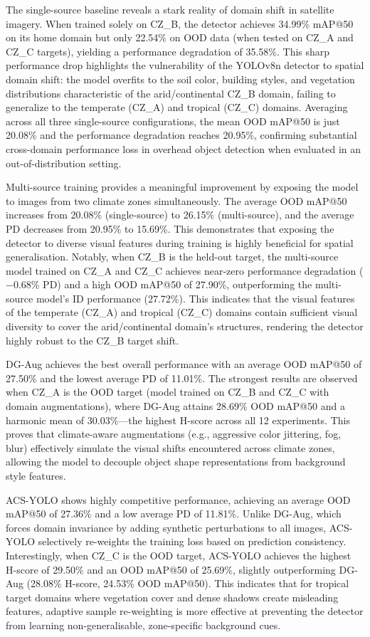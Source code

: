 \documentclass[12pt,a4paper]{article}
\begin{document}
The single-source baseline reveals a stark reality of domain shift in satellite imagery. When trained solely on CZ\_B, the detector achieves 34.99\% mAP@50 on its home domain but only 22.54\% on OOD data (when tested on CZ\_A and CZ\_C targets), yielding a performance degradation of 35.58\%. This sharp performance drop highlights the vulnerability of the YOLOv8n detector to spatial domain shift: the model overfits to the soil color, building styles, and vegetation distributions characteristic of the arid/continental CZ\_B domain, failing to generalize to the temperate (CZ\_A) and tropical (CZ\_C) domains. Averaging across all three single-source configurations, the mean OOD mAP@50 is just 20.08\% and the performance degradation reaches 20.95\%, confirming substantial cross-domain performance loss in overhead object detection when evaluated in an out-of-distribution setting.

Multi-source training provides a meaningful improvement by exposing the model to images from two climate zones simultaneously. The average OOD mAP@50 increases from 20.08\% (single-source) to 26.15\% (multi-source), and the average PD decreases from 20.95\% to 15.69\%. This demonstrates that exposing the detector to diverse visual features during training is highly beneficial for spatial generalisation. Notably, when CZ\_B is the held-out target, the multi-source model trained on CZ\_A and CZ\_C achieves near-zero performance degradation ($-$0.68\% PD) and a high OOD mAP@50 of 27.90\%, outperforming the multi-source model's ID performance (27.72\%). This indicates that the visual features of the temperate (CZ\_A) and tropical (CZ\_C) domains contain sufficient visual diversity to cover the arid/continental domain's structures, rendering the detector highly robust to the CZ\_B target shift.

DG-Aug achieves the best overall performance with an average OOD mAP@50 of 27.50\% and the lowest average PD of 11.01\%. The strongest results are observed when CZ\_A is the OOD target (model trained on CZ\_B and CZ\_C with domain augmentations), where DG-Aug attains 28.69\% OOD mAP@50 and a harmonic mean of 30.03\%---the highest H-score across all 12 experiments. This proves that climate-aware augmentations (e.g., aggressive color jittering, fog, blur) effectively simulate the visual shifts encountered across climate zones, allowing the model to decouple object shape representations from background style features.

ACS-YOLO shows highly competitive performance, achieving an average OOD mAP@50 of 27.36\% and a low average PD of 11.81\%. Unlike DG-Aug, which forces domain invariance by adding synthetic perturbations to all images, ACS-YOLO selectively re-weights the training loss based on prediction consistency. Interestingly, when CZ\_C is the OOD target, ACS-YOLO achieves the highest H-score of 29.50\% and an OOD mAP@50 of 25.69\%, slightly outperforming DG-Aug (28.08\% H-score, 24.53\% OOD mAP@50). This indicates that for tropical target domains where vegetation cover and dense shadows create misleading features, adaptive sample re-weighting is more effective at preventing the detector from learning non-generalisable, zone-specific background cues.
\end{document}
